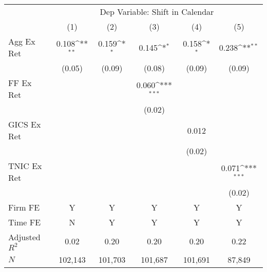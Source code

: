          {         \def\sym#1{\ifmmode^{#1}\else\(^{#1}\)\fi}         \begin{tabular}{l*{5}{c}}         \toprule          &\multicolumn{5}{c}{Dep Variable: Shift in Calendar} \\         \cmidrule(lr){2-6}           &\multicolumn{1}{c}{(1)}&\multicolumn{1}{c}{(2)} &\multicolumn{1}{c}{(3)}         &\multicolumn{1}{c}{(4)}        &\multicolumn{1}{c}{(5)} \\         
\midrule
Agg Ex Ret  &       0.108\sym{**} &       0.159\sym{*}  &       0.145\sym{*}  &       0.158\sym{*}  &       0.238\sym{**} \\
            &      (0.05)         &      (0.09)         &      (0.08)         &      (0.09)         &      (0.09)         \\
FF Ex Ret   &                     &                     &       0.060\sym{***}&                     &                     \\
            &                     &                     &      (0.02)         &                     &                     \\
GICS Ex Ret &                     &                     &                     &       0.012         &                     \\
            &                     &                     &                     &      (0.02)         &                     \\
TNIC Ex Ret &                     &                     &                     &                     &       0.071\sym{***}\\
            &                     &                     &                     &                     &      (0.02)         \\
         \cmidrule(lr){1-6}          \multicolumn{1}{l}{Firm FE} & Y&Y&Y&Y&Y \\         \multicolumn{1}{l}{Time FE} & N&Y&Y&Y&Y \\         
Adjusted $R^2$&        0.02         &        0.20         &        0.20         &        0.20         &        0.22         \\
$N$         &     102,143         &     101,703         &     101,687         &     101,691         &      87,849         \\
\bottomrule                         \end{tabular}                         }
